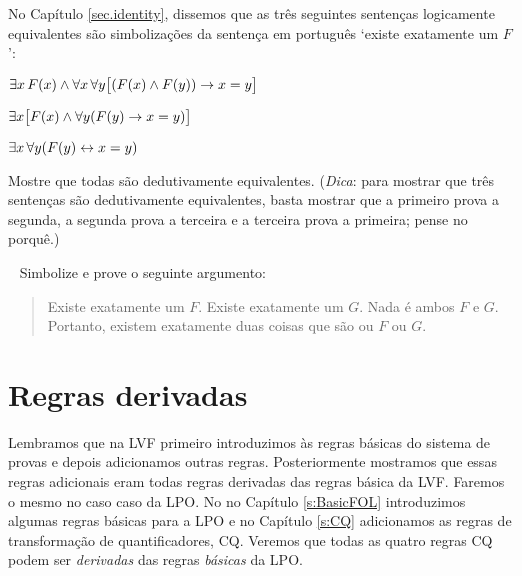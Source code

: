 \problempart
No Capítulo   \ref{sec.identity}, dissemos que as tr\^es seguintes senten\c cas logicamente equivalentes  s\~ao simboliza\c c\~oes da senten\c ca em portugu\^es `existe exatamente um $F$':
\begin{ebullet}
\item $\exists x\,\mathord{F}(x) \wedge \forall x\, \forall y \bigl[(\mathord{F}(x) \wedge \mathord{F}(y)) \rightarrow x = y\bigr]$
\item $\exists x \bigl[\mathord{F}(x) \wedge \forall y (\mathord{F}(y) \rightarrow x = y)\bigr]$
\item $\exists x\, \forall y (\mathord{F}(y) \leftrightarrow x = y)$
\end{ebullet}
Mostre que todas s\~ao dedutivamente equivalentes. (\emph{Dica}: para mostrar que tr\^es senten\c cas s\~ao dedutivamente equivalentes, basta mostrar que a  primeiro  prova a segunda, a segunda prova a terceira e a terceira prova a primeira; pense no porqu\^e.)

\
\problempart
Simbolize e prove o seguinte argumento:
	\begin{quote}
		Existe exatamente um $F$. Existe exatamente um $G$. Nada \'e ambos $F$ e $G$. Portanto, existem exatamente duas coisas que  s\~ao ou $F$ ou $G$.
	\end{quote}
 



\chapter{Regras derivadas}\label{s:DerivedFOL}
Lembramos que na LVF  primeiro introduzimos \`as regras b\'asicas do sistema de provas  e depois adicionamos outras regras.  Posteriormente mostramos que essas regras adicionais eram todas regras derivadas das regras b\'asica da LVF.  Faremos o mesmo no caso caso da LPO.  No no Capítulo  \ref{s:BasicFOL} introduzimos algumas regras b\'asicas para a LPO e no Capítulo  \ref{s:CQ} adicionamos  as  regras de transforma\c c\~ao de quantificadores, CQ.  Veremos que todas as quatro regras CQ podem ser \emph{derivadas} das regras \emph{b\'asicas} da LPO.  

